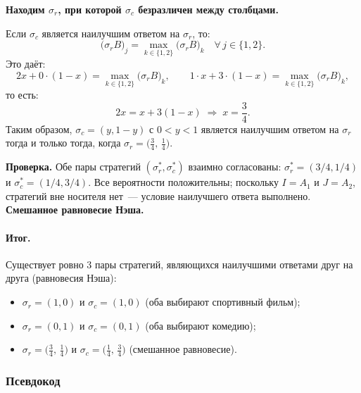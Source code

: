 \medskip
\noindent\textbf{Находим $\sigma_r$, при которой $\sigma_c$ безразличен
между столбцами.}

Если $\sigma_c$ является наилучшим ответом на $\sigma_r$, то:
\begin{equation}
\bigl(\sigma_r B\bigr)_j = \max_{k\in\{1,2\}}\bigl(\sigma_r B\bigr)_k
  \quad \forall\, j \in \{1,2\}.
\end{equation}
Это даёт:
\begin{equation}
2x + 0\cdot(1-x) = \max_{k\in\{1,2\}}\bigl(\sigma_r B\bigr)_k,
  \qquad
  1\cdot x + 3\cdot(1-x) = \max_{k\in\{1,2\}}\bigl(\sigma_r B\bigr)_k,
\end{equation}
то есть:
\begin{equation}
2x = x + 3(1-x)
  \;\Longrightarrow\;
  x = \frac{3}{4}.
\end{equation}
Таким образом, $\sigma_c = (y,1-y)$ с $0 < y < 1$ является
наилучшим ответом на $\sigma_r$ тогда и только тогда, когда
$\sigma_r = \bigl(\tfrac{3}{4},\,\tfrac{1}{4}\bigr)$.

\medskip
\noindent\textbf{Проверка.}
Обе пары стратегий $(\sigma_r^*, \sigma_c^*)$ взаимно согласованы:
$\sigma_r^* = (3/4, 1/4)$ и $\sigma_c^* = (1/4, 3/4)$.
Все вероятности положительны; поскольку $I = A_1$ и $J = A_2$,
стратегий вне носителя нет~---
условие наилучшего ответа выполнено.
\textbf{Смешанное равновесие Нэша. \checkmark}


\paragraph{Итог.}

Существует ровно 3 пары стратегий, являющихся наилучшими ответами
друг на друга (равновесия Нэша):
\begin{itemize}
  \item $\sigma_r = (1,0)$ и $\sigma_c = (1,0)$
        \hfill (оба выбирают спортивный фильм);
  \item $\sigma_r = (0,1)$ и $\sigma_c = (0,1)$
        \hfill (оба выбирают комедию);
  \item $\sigma_r = \bigl(\tfrac{3}{4},\,\tfrac{1}{4}\bigr)$
        и $\sigma_c = \bigl(\tfrac{1}{4},\,\tfrac{3}{4}\bigr)$
        \hfill (смешанное равновесие).
\end{itemize}

\subsubsection{Псевдокод}

